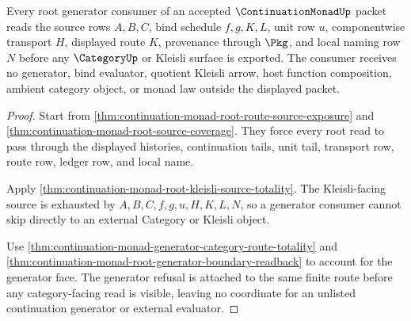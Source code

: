 \begin{theorem}
\label{thm:continuation-monad-root-generator-bind-coverage}
Every root generator consumer of an accepted $\ContinuationMonadUp$ packet reads the source rows $A,B,C$, bind schedule $f,g,K,L$, unit row $u$, componentwise transport $H$, displayed route $K$, provenance through $\Pkg$, and local naming row $N$ before any $\CategoryUp$ or Kleisli surface is exported. The consumer receives no generator, bind evaluator, quotient Kleisli arrow, host function composition, ambient category object, or monad law outside the displayed packet.
\end{theorem}
\begin{proof}
Start from \autoref{thm:continuation-monad-root-route-source-exposure} and \autoref{thm:continuation-monad-root-source-coverage}. They force every root read to pass through the displayed histories, continuation tails, unit tail, transport row, route row, ledger row, and local name.

Apply \autoref{thm:continuation-monad-root-kleisli-source-totality}. The Kleisli-facing source is exhausted by $A,B,C,f,g,u,H,K,L,N$, so a generator consumer cannot skip directly to an external Category or Kleisli object.

Use \autoref{thm:continuation-monad-generator-category-route-totality} and \autoref{thm:continuation-monad-root-generator-boundary-readback} to account for the generator face. The generator refusal is attached to the same finite route before any category-facing read is visible, leaving no coordinate for an unlisted continuation generator or external evaluator.
\end{proof}

